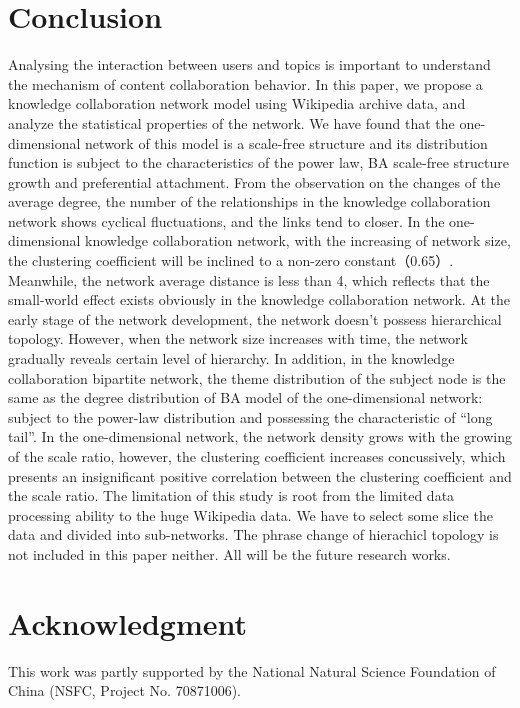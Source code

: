 \documentclass{elsarticle}
\begin{document}
\section{Conclusion}
\label{sec:5concl-disc-}

Analysing the interaction between users and topics is important to
understand the mechanism of content collaboration behavior. 
In this paper, we propose a knowledge collaboration network model
using  Wikipedia archive data, and analyze the statistical
properties of the network. We have found that the one-dimensional network of this model is a scale-free structure and its distribution function is subject to the characteristics of the power law, BA scale-free structure growth and preferential attachment. From the observation on the changes of the average degree, the number of the relationships in the knowledge collaboration network shows cyclical fluctuations, and the links tend to closer. In the one-dimensional knowledge collaboration network, with the increasing of network size, the clustering coefficient will be inclined to a non-zero constant（0.65）. Meanwhile, the network average distance is less than 4, which reflects that the small-world effect exists obviously in the knowledge collaboration network. At the early stage of the network development, the network doesn’t possess hierarchical topology. However, when the network size increases with time, the network gradually reveals certain level of hierarchy. In addition, in the knowledge collaboration bipartite network, the theme distribution of the subject node is the same as the degree distribution of BA model of the one-dimensional network: subject to the power-law distribution and possessing the characteristic of “long tail”. In the one-dimensional network, the network density grows with the growing of the scale ratio, however, the clustering coefficient increases concussively, which presents an insignificant positive correlation between the clustering coefficient and the scale ratio. The limitation of this study is root from the
limited data processing ability to the
huge Wikipedia data. We have to select some slice the data and divided
into sub-networks. The
phrase change of hierachicl topology is  not included in this paper
neither. All will be the future research works.  


\section*{Acknowledgment}
\label{sec:acknowledgment}
This work was partly supported by the National Natural Science Foundation of China (NSFC, Project No. 70871006).
\end{document}

